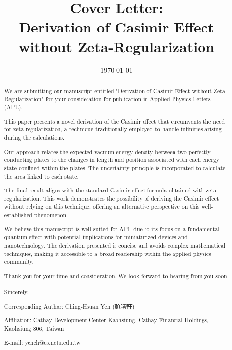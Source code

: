 \documentclass[aip,amsmath,amssymb,reprint]{revtex4-2}
\begin{document}
\title{Cover Letter:\\Derivation of Casimir Effect without Zeta-Regularization}

\date{\today}

\begin{abstract}
We are submitting our manuscript entitled "Derivation of Casimir Effect without Zeta-Regularization" for your consideration for publication in Applied Physics Letters (APL).

This paper presents a novel derivation of the Casimir effect that circumvents the need for zeta-regularization, a technique traditionally employed to handle infinities arising during the calculations. 

Our approach relates the expected vacuum energy density between two perfectly conducting plates to the changes in length and position associated with each energy state confined within the plates. The uncertainty principle is incorporated to calculate the area linked to each state.

The final result aligns with the standard Casimir effect formula obtained with zeta-regularization. This work demonstrates the possibility of deriving the Casimir effect without relying on this technique, offering an alternative perspective on this well-established phenomenon.

We believe this manuscript is well-suited for APL due to its focus on a fundamental quantum effect with potential implications for miniaturized devices and nanotechnology. The derivation presented is concise and avoids complex mathematical techniques, making it accessible to a broad readership within the applied physics community.

Thank you for your time and consideration. We look forward to hearing from you soon.
\\
\\
Sincerely,

\noindent Corresponding Author: Ching-Hsuan Yen (顏靖軒)

\noindent Affiliation: Cathay Development Center Kaohsiung, Cathay Financial Holdings, Kaohsiung 806, Taiwan

\noindent E-mail: yench@cs.nctu.edu.tw

\end{abstract}

\maketitle
\end{document}
